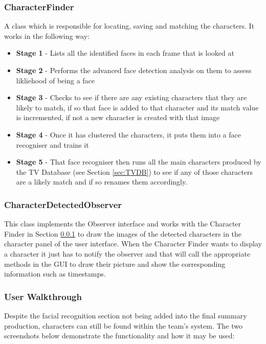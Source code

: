 \subsubsection{CharacterFinder}
\label{sec:CharacterFinder}
A class which is responsible for locating, saving and matching the characters. It works in the following way:
\begin{itemize}
	\item{\textbf{Stage 1} - Lists all the identified faces in each frame that is looked at}
	\item{\textbf{Stage 2} - Performs the advanced face detection analysis on them to assess likliehood of being a face}
	\item{\textbf{Stage 3} - Checks to see if there are any existing characters that they are likely to match, if so that face is added to that character and its match value is incremented, if not a new character is created with that image}
	\item{\textbf{Stage 4} - Once it has clustered the characters, it puts them into a face recogniser and trains it}
	\item{\textbf{Stage 5} - That face recogniser then runs all the main characters produced by the TV Database (see Section \ref{sec:TVDB}) 
	to see if any of those characters are a likely match and if so renames them accordingly}.
\end{itemize}

\subsubsection{CharacterDetectedObserver}
This class implements the Observer interface and works with the Character Finder in Section \ref{sec:CharacterFinder} to draw the images of the detected characters in the character panel of the user interface. When the Character Finder wants to display a character it just has to notify the observer and that will call the appropriate methods in the GUI to draw their picture and show the corresponding information such as timestamps. 

\newpage 
\subsubsection{User Walkthrough}
Despite the facial recognition section not being added into the final summary production, characters can still be found within the team's system. The two screenshots below demonstrate the functionality and how it may be used: 

